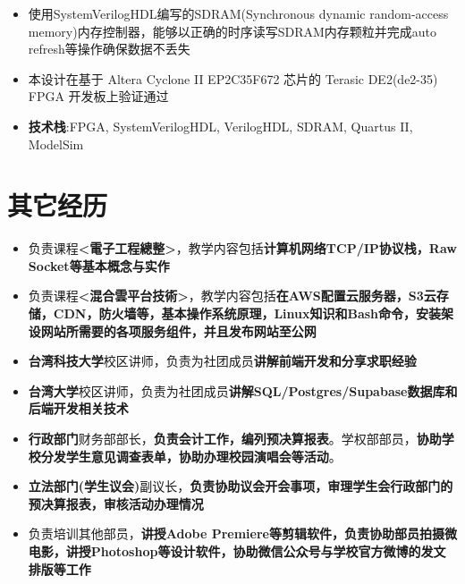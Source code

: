 \documentclass{resume}
\newcommand{\iconsection}[2]{
    \section[\texorpdfstring{#2}{#2}]{\faIcon{#1}\quad #2}
}
\begin{document}
            \begin{itemize}
                \item 使用SystemVerilogHDL编写的SDRAM(Synchronous dynamic random-access memory)内存控制器，能够以正确的时序读写SDRAM内存颗粒并完成auto refresh等操作确保数据不丢失
                \item 本设计在基于 Altera Cyclone II EP2C35F672 芯片的 Terasic DE2(de2-35) FPGA 开发板上验证通过
                \item \textbf{技术栈}:FPGA, SystemVerilogHDL, VerilogHDL, SDRAM, Quartus II, ModelSim
            \end{itemize}

    \iconsection{history}{其它经历}
            \begin{itemize}
                \item 负责课程\textbf{<電子工程總整>}，教学内容包括\textbf{计算机网络TCP/IP协议栈，Raw Socket等基本概念与实作}
                \item 负责课程\textbf{<混合雲平台技術>}，教学内容包括\textbf{在AWS配置云服务器，S3云存储，CDN，防火墙等，基本操作系统原理，Linux知识和Bash命令，安装架设网站所需要的各项服务组件，并且发布网站至公网}
            \end{itemize}
            \begin{itemize}
                \item \textbf{台湾科技大学}校区讲师，负责为社团成员\textbf{讲解前端开发和分享求职经验}
                \item \textbf{台湾大学}校区讲师，负责为社团成员\textbf{讲解SQL/Postgres/Supabase数据库和后端开发相关技术}
            \end{itemize}
            \begin{itemize}
                \item \textbf{行政部门}财务部部长，\textbf{负责会计工作，编列预决算报表}。学权部部员，\textbf{协助学校分发学生意见调查表单，协助办理校园演唱会等活动}。
                \item \textbf{立法部门(学生议会)}副议长，\textbf{负责协助议会开会事项，审理学生会行政部门的预决算报表，审核活动办理情况}
            \end{itemize}
            \begin{itemize}
                \item 负责培训其他部员，\textbf{讲授Adobe Premiere等剪辑软件，负责协助部员拍摄微电影，讲授Photoshop等设计软件，协助微信公众号与学校官方微博的发文排版等工作}
            \end{itemize}
\end{document}
